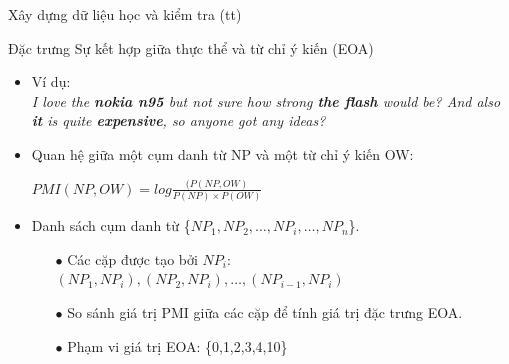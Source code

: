 \documentclass[9pt,xcolor=table,hyperref=unicode]{beamer}
\begin{document}
	\begin{frame}{Xây dựng dữ liệu học và kiểm tra (tt)}
		\begin{block}{Đặc trưng Sự kết hợp giữa thực thể và từ chỉ ý kiến (EOA)}
			\begin{itemize}
				\item{Ví dụ:\\
				\textit{I love the \textbf{nokia n95} but not sure how strong \textbf{the flash} would be? And also \textbf{it} is quite \textbf{expensive}, so anyone got any ideas?}}				
				\item{Quan hệ giữa một cụm danh từ NP và một từ chỉ ý kiến OW: \\
					\begin{center}
						$PMI(NP,OW) = log\frac{(P(NP,OW)}{P(NP)\times P(OW)}$
					\end{center}}
				\item{Danh sách cụm danh từ \{$NP_{1},NP_{2},…,NP_{i},…,NP_{n}$\}.
					\begin{itemize}
						\item[$\bullet$]{Các cặp được tạo bởi $NP_{i}$: $(NP_{1},NP_{i}),(NP_{2},NP_{i}),…,(NP_{i-1},NP_{i})$}
						\item[$\bullet$]{So sánh giá trị PMI giữa các cặp để tính giá trị đặc trưng EOA.}
						\item[$\bullet$]{Phạm vi giá trị EOA: \{0,1,2,3,4,10\}}
					\end{itemize}}
			\end{itemize}
		\end{block}		
	\end{frame}
\end{document}
